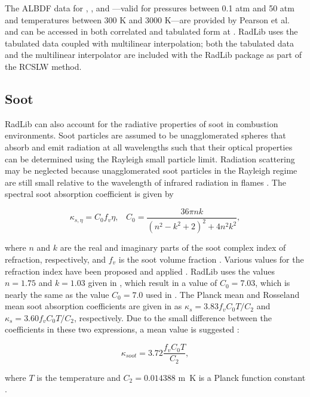 \documentclass[preprint,12pt]{elsarticle}
\begin{document}
The ALBDF data for , , and ---valid for pressures between 0.1 atm and 50 atm and temperatures between 300 K and 3000 K---are provided by Pearson et al. \cite{Pearson_2014} and can be accessed in both correlated and tabulated form at \cite{Solovjov_2014b}. RadLib uses the tabulated data coupled with multilinear interpolation; both the tabulated data and the multilinear interpolator are included with the RadLib package as part of the RCSLW method.


\subsection{Soot} \label{s:soot}

RadLib can also account for the radiative properties of soot in combustion environments. Soot particles are assumed to be unagglomerated spheres that absorb and emit radiation at all wavelengths such that their optical properties can be determined using the Rayleigh small particle limit. Radiation scattering may be neglected because unagglomerated soot particles in the Rayleigh regime are still small relative to the wavelength of infrared radiation in flames \cite{Brewster_1992,Solovjov_2001}. The spectral soot absorption coefficient is given by 
%
\begin{linenomath}
\begin{equation}
\label{e:soot1}
	\kappa_{s,\eta}=C_0 f_v \eta, \; \; \; C_0 = \frac{36\pi n k}{(n^2-k^2+2)^2+4n^2k^2},
\end{equation}
\end{linenomath}
%
where $n$ and $k$ are the real and imaginary parts of the soot complex index of refraction, respectively, and $f_v$ is the soot volume fraction \cite{Solovjov_2001,Modest_2013}. Various values for the refraction index have been proposed and applied \cite{Lee_1981,Stull_1960,Dalzell_1969,Howarth_1966,Chang_1990,Felske_1984,Williams_2007}. 
RadLib uses the values $n=1.75$ and $k=1.03$ given in \cite{Williams_2007}, which result in a value of $C_0=7.03$, which is nearly the same as the value $C_0=7.0$ used in \cite{Solovjov_2001}. 
The Planck mean and Rosseland mean soot absorption coefficients are given in \cite{Modest_2013} as $\kappa_s=3.83f_vC_0T/C_2$ and $\kappa_s=3.60f_vC_0T/C_2$, respectively.
Due to the small difference between the coefficients in these two expressions, a mean value is suggested \cite{Felske_1977,Modest_2013}:
%
\begin{linenomath}
\begin{equation}
\label{e:soot2}
	\kappa_{soot}=3.72\frac{f_vC_0T}{C_2},
\end{equation}
\end{linenomath}
%
where $T$ is the temperature and $C_2=0.014388$ \si{m.K} is a Planck function constant \cite{Modest_2013}. 
\end{document}

